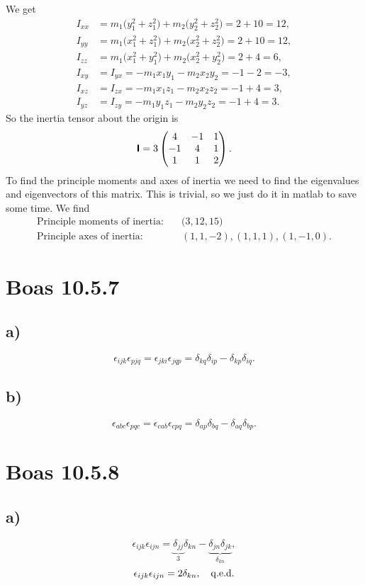 \documentclass[a4paper, 11pt, titlepage, english]{article}
\newcommand{\eps}{\epsilon}
\newcommand{\mat}[1]{\textsf{\textbf{#1}}}
\begin{document}
We get
\begin{align*}
I_{xx} &= m_1\big(y_1^2+z_1^2\big) + m_2\big(y_2^2+z_2^2\big) = 2 + 10 = 12, \\
I_{yy} &= m_1\big(x_1^2+z_1^2\big) + m_2\big(x_2^2+z_2^2\big) = 2 + 10 = 12, \\
I_{zz} &= m_1\big(x_1^2+y_1^2\big) + m_2\big(x_2^2+y_2^2\big) = 2 + 4 = 6, \\
I_{xy} &= I_{yx} = -m_1x_1y_1 -m_2x_2y_2 = -1-2 = -3, \\
I_{xz} &= I_{zx} = -m_1x_1z_1 -m_2x_2z_2 = -1+4 = 3, \\
I_{yz} &= I_{zy} = -m_1y_1z_1 -m_2y_2z_2 = -1+4 = 3.
\end{align*}
So the inertia tensor about the origin is
$$\mat{I} = 3\begin{pmatrix}
             4 & -1 & 1 \\ -1 & 4 & 1 \\ 1 & 1 & 2
            \end{pmatrix}. $$
To find the principle moments and axes of inertia we need to find the eigenvalues and eigenvectors of this matrix. This is trivial, so we just do it in matlab to save some time. We find
\begin{align*}
\text{Principle moments of inertia:} &\quad \big(3, 12, 15\big) \\ 
\text{Principle axes of inertia:} &\quad (1,1,-2), (1,1,1), (1,-1,0).
\end{align*}

\clearpage

\section*{Boas 10.5.7}
\subsection*{a)}
$$\eps_{ijk}\eps_{pjq} = \eps_{jki}\eps_{jqp} = \delta_{kq}\delta_{ip} - \delta_{kp}\delta_{iq}.$$
\subsection*{b)}
$$\eps_{abc}\eps_{pqc} = \eps_{cab}\eps_{cpq} = \delta_{ap}\delta_{bq} - \delta_{aq}\delta_{bp}.$$

\section*{Boas 10.5.8}
\subsection*{a)}
$$\eps_{ijk}\eps_{ijn} = \underbrace{\delta_{jj}}_{3}\delta_{kn} - \underbrace{\delta_{jn}\delta_{jk}}_{\delta_{kn}},$$
$$\eps_{ijk}\eps_{ijn} = 2\delta_{kn}, \quad {\rm q.e.d.}$$
\end{document}
